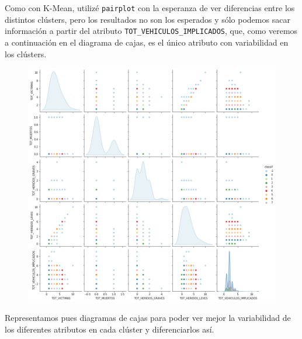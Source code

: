 \documentclass[a4]{article}
\begin{document}
Como con K-Mean, utilizé \texttt{pairplot} con la esperanza de ver diferencias entre los distintos clústers, pero los resultados no son los esperados y sólo podemos sacar información a partir del atributo \texttt{TOT\_VEHICULOS\_IMPLICADOS}, que, como veremos a continuación en el diagrama de cajas, es el único atributo con variabilidad en los clústers.

\begin{figure}[H]
  \centering
  \includegraphics[width=180mm]{imagenes/c2_dbscan_pairplot}
\end{figure}

Representamos pues diagramas de cajas para poder ver mejor la variabilidad de los diferentes atributos en cada clúster y diferenciarlos así.
\end{document}
